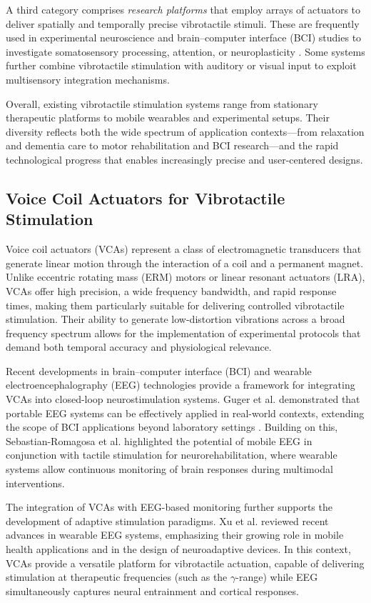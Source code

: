A third category comprises \textit{research platforms} that employ arrays of actuators to deliver spatially and temporally precise vibrotactile stimuli. These are frequently used in experimental neuroscience and brain–computer interface (BCI) studies to investigate somatosensory processing, attention, or neuroplasticity \cite{Guger.2012, SebastianRomagosa.2020}. Some systems further combine vibrotactile stimulation with auditory or visual input to exploit multisensory integration mechanisms.

Overall, existing vibrotactile stimulation systems range from stationary therapeutic platforms to mobile wearables and experimental setups. Their diversity reflects both the wide spectrum of application contexts—from relaxation and dementia care to motor rehabilitation and BCI research—and the rapid technological progress that enables increasingly precise and user-centered designs.


\subsection{Voice Coil Actuators for Vibrotactile Stimulation}
Voice coil actuators (VCAs) represent a class of electromagnetic transducers that generate linear motion through the interaction of a coil and a permanent magnet. Unlike eccentric rotating mass (ERM) motors or linear resonant actuators (LRA), VCAs offer high precision, a wide frequency bandwidth, and rapid response times, making them particularly suitable for delivering controlled vibrotactile stimulation. Their ability to generate low-distortion vibrations across a broad frequency spectrum allows for the implementation of experimental protocols that demand both temporal accuracy and physiological relevance.

Recent developments in brain–computer interface (BCI) and wearable electroencephalography (EEG) technologies provide a framework for integrating VCAs into closed-loop neurostimulation systems. Guger et al. demonstrated that portable EEG systems can be effectively applied in real-world contexts, extending the scope of BCI applications beyond laboratory settings \cite{Guger.2012, Guger.2017}. Building on this, Sebastian-Romagosa et al. \cite{SebastianRomagosa.2020} highlighted the potential of mobile EEG in conjunction with tactile stimulation for neurorehabilitation, where wearable systems allow continuous monitoring of brain responses during multimodal interventions.

The integration of VCAs with EEG-based monitoring further supports the development of adaptive stimulation paradigms. Xu et al. \cite{Xu.2022} reviewed recent advances in wearable EEG systems, emphasizing their growing role in mobile health applications and in the design of neuroadaptive devices. In this context, VCAs provide a versatile platform for vibrotactile actuation, capable of delivering stimulation at therapeutic frequencies (such as the $\gamma$-range) while EEG simultaneously captures neural entrainment and cortical responses.

